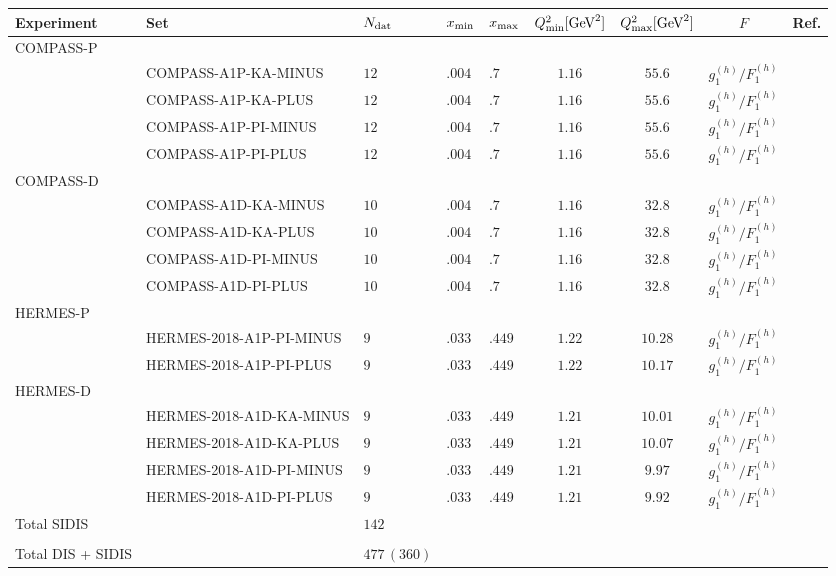 \begin{tabularx}{1\pdfpagewidth}{llXXXcccc}
  \toprule \toprule
   Experiment    & Set       &  $N_{\textrm{dat}}$  &  $x_{\textrm{min}}$  &  $x_{\textrm{max}}$  & $Q^2_{\textrm{min}} [\textrm{GeV}^2]$ &  $Q^2_{\textrm{max}} [\textrm{GeV}^2]$ &    $F$    &  Ref. \\
  \midrule
   COMPASS-P 
     \\          & COMPASS-A1P-KA-MINUS & $12$ & $.004$ & $.7$ & $1.16$ & $55.6$ & $g_1^{(h)}/F_1^{(h)}$ & \cite{COMPASS:2010hwr} \\
                 & COMPASS-A1P-KA-PLUS & $12$ & $.004$ & $.7$ & $1.16$ & $55.6$ & $g_1^{(h)}/F_1^{(h)}$ & \cite{COMPASS:2010hwr} \\
                 & COMPASS-A1P-PI-MINUS & $12$ & $.004$ & $.7$ & $1.16$ & $55.6$ & $g_1^{(h)}/F_1^{(h)}$ & \cite{COMPASS:2010hwr} \\
                 & COMPASS-A1P-PI-PLUS & $12$ & $.004$ & $.7$ & $1.16$ & $55.6$ & $g_1^{(h)}/F_1^{(h)}$ & \cite{COMPASS:2010hwr} \\
  \midrule
   COMPASS-D 
     \\          & COMPASS-A1D-KA-MINUS & $10$ & $.004$ & $.7$ & $1.16$ & $32.8$ & $g_1^{(h)}/F_1^{(h)}$ & \cite{COMPASS:2010hwr} \\
                 & COMPASS-A1D-KA-PLUS & $10$ & $.004$ & $.7$ & $1.16$ & $32.8$ & $g_1^{(h)}/F_1^{(h)}$ & \cite{COMPASS:2010hwr} \\
                 & COMPASS-A1D-PI-MINUS & $10$ & $.004$ & $.7$ & $1.16$ & $32.8$ & $g_1^{(h)}/F_1^{(h)}$ & \cite{COMPASS:2010hwr} \\
                 & COMPASS-A1D-PI-PLUS & $10$ & $.004$ & $.7$ & $1.16$ & $32.8$ & $g_1^{(h)}/F_1^{(h)}$ & \cite{COMPASS:2010hwr} \\
  \midrule
   HERMES-P 
     \\          & HERMES-2018-A1P-PI-MINUS & $9$ & $.033$ & $.449$ & $1.22$ & $10.28$ & $g_1^{(h)}/F_1^{(h)}$ & \cite{HERMES:2018awh} \\
                 & HERMES-2018-A1P-PI-PLUS & $9$ & $.033$ & $.449$ & $1.22$ & $10.17$ & $g_1^{(h)}/F_1^{(h)}$ & \cite{HERMES:2018awh} \\ 
  \midrule
   HERMES-D 
     \\          & HERMES-2018-A1D-KA-MINUS & $9$ & $.033$ & $.449$ & $1.21$ & $10.01$ & $g_1^{(h)}/F_1^{(h)}$ & \cite{HERMES:2018awh} \\
                 & HERMES-2018-A1D-KA-PLUS & $9$ & $.033$ & $.449$ & $1.21$ & $10.07$ & $g_1^{(h)}/F_1^{(h)}$ & \cite{HERMES:2018awh} \\
                 & HERMES-2018-A1D-PI-MINUS & $9$ & $.033$ & $.449$ & $1.21$ & $9.97$ & $g_1^{(h)}/F_1^{(h)}$ & \cite{HERMES:2018awh} \\
                 & HERMES-2018-A1D-PI-PLUS & $9$ & $.033$ & $.449$ & $1.21$ & $9.92$ & $g_1^{(h)}/F_1^{(h)}$ & \cite{HERMES:2018awh}\\
  \midrule
   Total  SIDIS        &    & $142$  &      &      &         &     &     &      \\
  \midrule \toprule
   \\[0.5pt]
   Total DIS + SIDIS& & $477 \, (360)$ & & & & & & \\
  \bottomrule
\end{tabularx}